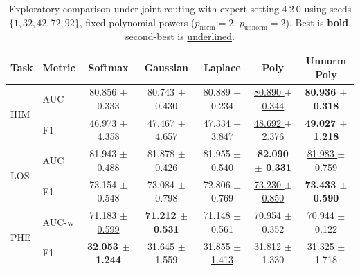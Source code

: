 \begin{table}[h]
\centering
\small
\setlength{\tabcolsep}{4pt}
\begin{tabular}{llccccc}
\toprule
Task & Metric & Softmax & Gaussian & Laplace & Poly & Unnorm Poly \\
\midrule
\multirow{2}{*}{IHM} & AUC & 80.856 $\pm$ 0.333 & 80.743 $\pm$ 0.430 & 80.889 $\pm$ 0.234 & \underline{80.890 $\pm$ 0.344} & \textbf{80.936 $\pm$ 0.318} \\
 & F1 & 46.973 $\pm$ 4.358 & 47.467 $\pm$ 4.657 & 47.334 $\pm$ 3.847 & \underline{48.692 $\pm$ 2.376} & \textbf{49.027 $\pm$ 1.218} \\
\midrule
\multirow{2}{*}{LOS} & AUC & 81.943 $\pm$ 0.488 & 81.878 $\pm$ 0.426 & 81.955 $\pm$ 0.540 & \textbf{82.090 $\pm$ 0.331} & \underline{81.983 $\pm$ 0.759} \\
 & F1 & 73.154 $\pm$ 0.548 & 73.084 $\pm$ 0.798 & 72.806 $\pm$ 0.769 & \underline{73.230 $\pm$ 0.850} & \textbf{73.433 $\pm$ 0.590} \\
\midrule
\multirow{2}{*}{PHE} & AUC-w & \underline{71.183 $\pm$ 0.599} & \textbf{71.212 $\pm$ 0.531} & 71.148 $\pm$ 0.561 & 70.954 $\pm$ 0.352 & 70.944 $\pm$ 0.122 \\
 & F1 & \textbf{32.053 $\pm$ 1.244} & 31.645 $\pm$ 1.559 & \underline{31.855 $\pm$ 1.413} & 31.812 $\pm$ 1.330 & 31.325 $\pm$ 1.718 \\
\bottomrule
\end{tabular}
\caption{Exploratory comparison under joint routing with expert setting $4\ 2\ 0$ using seeds $\{1,32,42,72,92\}$, fixed polynomial powers ($p_\text{norm}=2$, $p_\text{unnorm}=2$). Best is \textbf{bold}, second-best is \underline{underlined}.}
\label{tab:explore5seed_constp2p2_5seed_132427292_joint420_gating_table}
\end{table}
